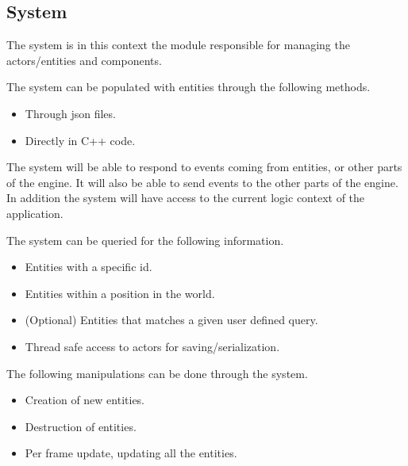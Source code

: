 \subsection{System}
The system is in this context the module responsible for managing the actors/entities and components.

The system can be populated with entities through the following methods.
\begin{itemize}
    \item
    Through json files.

    \item
    Directly in C++ code.
\end{itemize}

The system will be able to respond to events coming from entities, or other parts of the engine. 
It will also be able to send events to the other parts of the engine.
In addition the system will have access to the current logic context of the application.

The system can be queried for the following information.
\begin{itemize}
    \item
    Entities with a specific id.

    \item
    Entities within a position in the world.

    \item
    (Optional) Entities that matches a given user defined query.

    \item
    Thread safe access to actors for saving/serialization.
\end{itemize}

The following manipulations can be done through the system.
\begin{itemize}
    \item
    Creation of new entities.

    \item
    Destruction of entities.

    \item
    Per frame update, updating all the entities.
\end{itemize}
